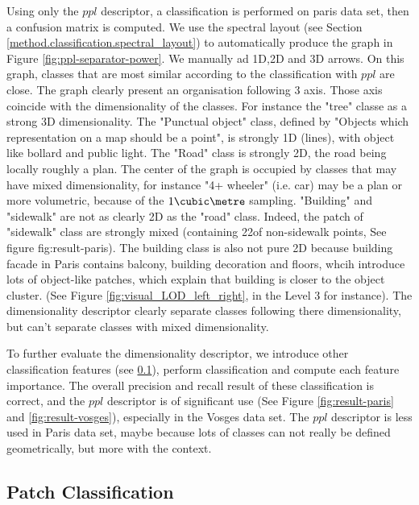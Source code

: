 		Using only the $ppl$ descriptor, a classification is performed on paris data set, then a confusion matrix is computed.
		We use the spectral layout (see Section \ref{method.classification.spectral_layout}) to automatically produce the graph in Figure \ref{fig:ppl-separator-power}. 
		We manually ad 1D,2D and 3D arrows.
		On this graph, classes that are most similar according to the classification with $ppl$ are close. The graph clearly present an organisation following 3 axis. Those axis coincide with the dimensionality of the classes. For instance the "tree" classe as a strong 3D dimensionality. The "Punctual object" class, defined by "Objects which representation on a map should be a point", is strongly 1D (lines), with object like bollard and public light. The "Road" class is strongly 2D, the road being locally roughly a plan. The center of the graph is occupied by classes that may have mixed dimensionality, for instance "4+ wheeler" (i.e. car) may be a plan or more volumetric, because of the $1 \cubic \metre$ sampling.
		"Building" and "sidewalk" are not as clearly 2D as  the "road" class. Indeed, the patch of "sidewalk" class are strongly mixed (containing 22\mypercent of non-sidewalk points, See figure fig:result-paris). The building class is also not pure 2D because building facade in Paris contains balcony, building decoration and floors, whcih introduce lots of object-like patches, which explain that building is closer to the object cluster. (See Figure \ref{fig:visual_LOD_left_right}, in the Level 3 for instance).
		The dimensionality descriptor clearly separate classes following there dimensionality, but can't separate classes with mixed dimensionality.
		
		
		To further evaluate the dimensionality descriptor, we introduce other classification features (see \ref{result.classification}), perform classification and compute each feature importance.
		The overall precision and recall result of these classification is correct, and the $ppl$ descriptor is of significant use (See Figure \ref{fig:result-paris} and \ref{fig:result-vosges}), especially in the Vosges data set. The $ppl$ descriptor is less used in Paris data set, maybe because lots of classes can not really be defined geometrically, but more with the context.
		  
	\subsection{Patch Classification}
		\label{result.classification}
		 
